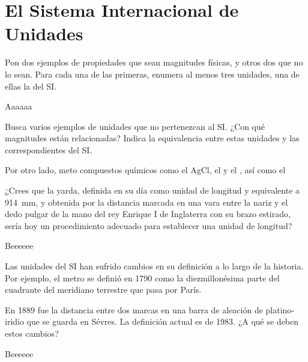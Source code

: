 \documentclass[
]{article}
\author{}
\date{}
\begin{document}
\hypertarget{el-sistema-internacional-de-unidades}{%
\section{El Sistema Internacional de
Unidades}\label{el-sistema-internacional-de-unidades}}

\begin{exercise}Pon dos ejemplos de propiedades que sean magnitudes
físicas, y otros dos que no lo sean. Para cada una de las primeras,
enumera al menos tres unidades, una de ellas la del SI.\end{exercise}

\begin{solution}Aaaaaa\end{solution}

\begin{exercise}Busca varios ejemplos de unidades que no pertenezcan al
SI. ¿Con qué magnitudes están relacionadas? Indica la equivalencia entre
estas unidades y las correspondientes del SI.

Por otro lado, meto compuestos químicos como el AgCl, el  y
el , así como el \end{exercise}

\begin{exercise}[OXF15] ¿Crees que la yarda, definida en su día como
unidad de longitud y equivalente a 914~mm, y obtenida por la distancia
marcada en una vara entre la nariz y el dedo pulgar de la mano del rey
Enrique I de Inglaterra con su brazo estirado, sería hoy un
procedimiento adecuado para establecer una unidad de
longitud?\end{exercise}

\begin{solution}Beeeeee\end{solution}

\begin{exercise}Las unidades del SI han sufrido cambios en su definición
a lo largo de la historia. Por ejemplo, el metro se definió en 1790 como
la diezmillonésima parte del cuadrante del meridiano terrestre que pasa
por París.

En 1889 fue la distancia entre dos marcas en una barra de aleación de
platino-iridio que se guarda en Sévres. La definición actual es de 1983.
¿A qué se deben estos cambios?\end{exercise}

\begin{solution}Beeeeee\end{solution}
\end{document}
